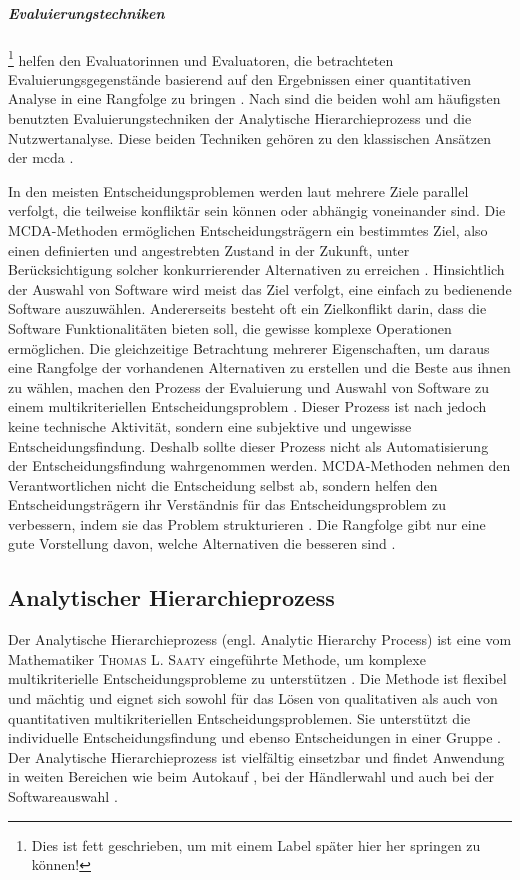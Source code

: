 \subparagraph{\textrm{Evaluierungstechniken}}\footnote{%
Dies ist fett geschrieben, um mit einem Label später hier her springen zu können!}
%
\label{citedemo}
 helfen den Evaluatorinnen und Evaluatoren, die betrachteten
Evaluierungsgegenstände basierend auf den Ergebnissen einer quantitativen Analyse in eine
Rangfolge zu bringen \parencite[s.][]{Lai1999}. Nach \textcite{Jadhav2011} sind die beiden wohl 
am häufigsten benutzten Evaluierungstechniken der Analytische Hierarchieprozess und die
Nutzwertanalyse. Diese beiden Techniken gehören zu den klassischen Ansätzen der 
\gls{mcda} \parencite[s.][]{Geldermann2014}.

In den meisten Entscheidungsproblemen werden laut \citeauthor{Geldermann2014}
mehrere Ziele parallel verfolgt, die teilweise
konfliktär sein können oder abhängig voneinander sind.
Die MCDA-Methoden ermöglichen Entscheidungsträgern ein bestimmtes Ziel, also einen definierten
und angestrebten Zustand in der Zukunft, unter Berücksichtigung solcher konkurrierender
Alternativen zu erreichen \parencite[s.][]{Lai1999}.
Hinsichtlich der Auswahl von Software wird \zB meist das Ziel verfolgt, eine
einfach zu bedienende Software auszuwählen. Andererseits besteht oft ein Zielkonflikt darin, dass
die Software Funktionalitäten bieten soll, die gewisse komplexe Operationen ermöglichen. Die
gleichzeitige Betrachtung mehrerer Eigenschaften, um daraus eine Rangfolge der
vorhandenen Alternativen zu erstellen und die Beste aus ihnen zu wählen, machen den
Prozess der Evaluierung und Auswahl von Software zu einem multikriteriellen
Entscheidungsproblem \parencite[s.][]{Jadhav2011}. Dieser Prozess ist nach \textcite{Stamelos2000}
jedoch keine technische Aktivität, sondern eine subjektive und ungewisse Entscheidungsfindung.
Deshalb sollte dieser Prozess nicht als Automatisierung
der Entscheidungsfindung wahrgenommen werden. MCDA-Methoden nehmen den
Verantwortlichen nicht die Entscheidung selbst ab, sondern
helfen den Entscheidungsträgern ihr Verständnis für das Entscheidungsproblem zu
verbessern, indem sie das Problem strukturieren \parencite[s.][]{Geldermann2014}. 
Die Rangfolge gibt nur eine gute Vorstellung davon, welche Alternativen die besseren sind
\parencite[s.][]{Jadhav2011}. 
%
\subsection{Analytischer Hierarchieprozess}
\label{subsec:FM-Eval-Analytischer_Hierarchieprozess}
Der Analytische Hierarchieprozess (engl. Analytic Hierarchy Process) ist eine vom
Mathematiker \textsc{Thomas L. Saaty} eingeführte Methode, um komplexe multikriterielle
Entscheidungsprobleme zu unterstützen \parencite[s.][]{Saaty1990}. Die Methode ist flexibel und
mächtig und eignet sich sowohl für das Lösen von qualitativen als auch von quantitativen
multikriteriellen Entscheidungsproblemen. Sie unterstützt die individuelle Entscheidungsfindung
und ebenso Entscheidungen in einer Gruppe \parencite[s.][]{Lai2002}. Der
Analytische Hierarchieprozess ist vielfältig einsetzbar und findet Anwendung in weiten
Bereichen wie \zB beim Autokauf \parencite[s.][]{Byun2001}, bei der Händlerwahl 
\parencite[s.][]{Tam2001} und auch bei der Softwareauswahl \parencite[s.][]{Lai1999}.
%
